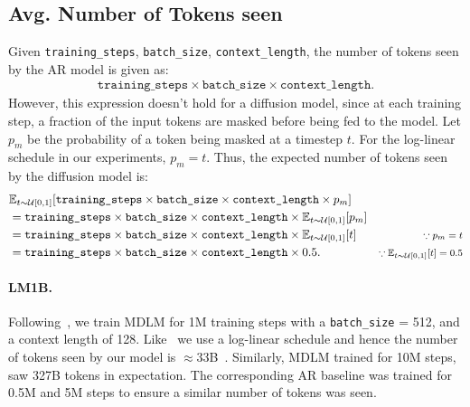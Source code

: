 \documentclass{article} %
\def\algo{MDLM}
\begin{document}
{\begin{appendices}
\subsection{Avg. Number of Tokens seen}\label{supp:sec:avg_tokens_seen}

Given \texttt{training\_steps}, \texttt{batch\_size}, \texttt{context\_length}, the number of tokens seen by the AR model is given as:
\begin{align}
    \texttt{training\_steps} \times \texttt{batch\_size} \times \texttt{context\_length}.
\end{align}
However, this expression doesn't hold for a diffusion model, since at each training step, a fraction of the input tokens are masked before being fed to the model. Let $p_m$ be the probability of a token being masked at a timestep $t$. For the log-linear schedule in our experiments, $p_m=t$. Thus, the expected number of tokens seen by the diffusion model is: 
\begin{align}\label{supp:eqn:diff_tokens}
    & \mathbb{E}_{t \sim \mathcal{U}[0, 1]} [\texttt{training\_steps} \times \texttt{batch\_size} \times \texttt{context\_length} \times p_m] & \nonumber \\
    & = \texttt{training\_steps} \times \texttt{batch\_size} \times \texttt{context\_length} \times \mathbb{E}_{t \sim \mathcal{U}[0, 1]} [p_m] & \nonumber \\
    & = \texttt{training\_steps} \times \texttt{batch\_size} \times \texttt{context\_length} \times \mathbb{E}_{t \sim \mathcal{U}[0, 1]} [t] & \text{\footnotesize $\because p_m = t$}\nonumber \\
    & = \texttt{training\_steps} \times \texttt{batch\_size} \times \texttt{context\_length} \times 0.5. & \text{\footnotesize $\because \mathbb{E}_{t \sim \mathcal{U}[0, 1]} [t] = 0.5$}
\end{align}

\paragraph{LM1B.} Following~\citep{austin2021structured, lou2023discrete, he2022diffusionbert}, we train \algo{} for 1M training steps with a \texttt{batch\_size} = 512, and a context length of 128. Like~\citep{lou2023discrete} we use a log-linear schedule and hence the number of tokens seen by our model is $\approx 33$B~. Similarly, \algo{} trained for 10M steps, saw 327B tokens in expectation. The corresponding AR baseline was trained for 0.5M and 5M steps to ensure a similar number of tokens was seen. 


\end{appendices}}
\end{document}
